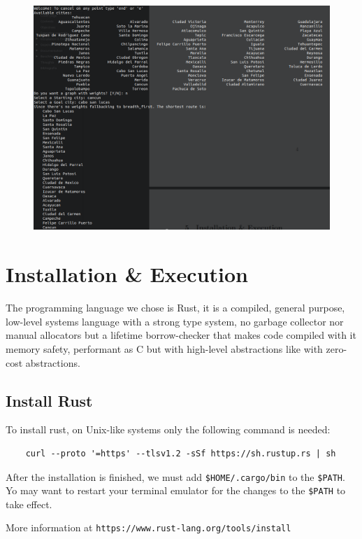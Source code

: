 \begin{figure}[H]
    \centering
    \includegraphics[scale=0.4]{../img/corrida3}
\end{figure}
\newpage
\section{Installation \& Execution}

The programming language we chose is Rust, it is a compiled,
general purpose, low-level systems language with a strong type system,
no garbage collector nor manual allocators but a lifetime borrow-checker that
makes code compiled with it memory safety, performant as C but with high-level
abstractions like with zero-cost abstractions.

\subsection{Install Rust}

To install rust, on Unix-like systems only the following command is needed:

\begin{verbatim}
    curl --proto '=https' --tlsv1.2 -sSf https://sh.rustup.rs | sh
\end{verbatim}

After the installation is finished, we must add \texttt{\$HOME/.cargo/bin} to the \texttt{\$PATH}.
Yo may want to restart your terminal emulator for the changes to the \texttt{\$PATH} to take effect.

More information at \texttt{https://www.rust-lang.org/tools/install}

